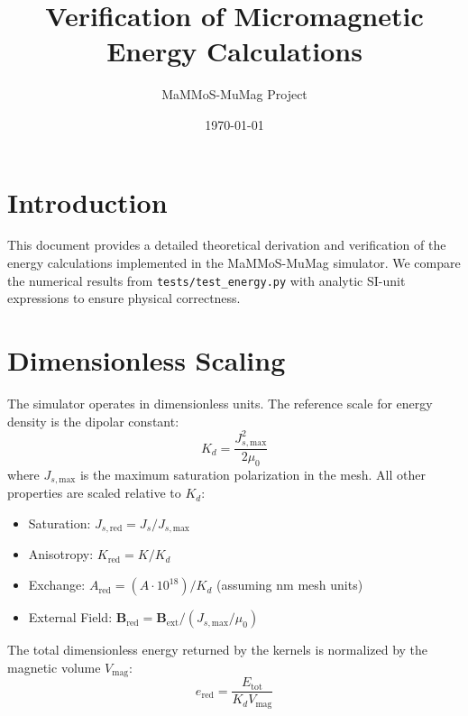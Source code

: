 \documentclass[11pt]{article}
\title{Verification of Micromagnetic Energy Calculations}
\author{MaMMoS-MuMag Project}
\date{\today}
\begin{document}
\maketitle

\section{Introduction}
This document provides a detailed theoretical derivation and verification of the energy calculations implemented in the MaMMoS-MuMag simulator. We compare the numerical results from \texttt{tests/test\_energy.py} with analytic SI-unit expressions to ensure physical correctness.

\section{Dimensionless Scaling}
The simulator operates in dimensionless units. The reference scale for energy density is the dipolar constant:
\begin{equation}
    K_d = \frac{J_{s,\text{max}}^2}{2\mu_0}
\end{equation}
where $J_{s,\text{max}}$ is the maximum saturation polarization in the mesh. All other properties are scaled relative to $K_d$:
\begin{itemize}
    \item Saturation: $J_{s,\text{red}} = J_s / J_{s,\text{max}}$
    \item Anisotropy: $K_{\text{red}} = K / K_d$
    \item Exchange: $A_{\text{red}} = (A \cdot 10^{18}) / K_d$ (assuming nm mesh units)
    \item External Field: $\mathbf{B}_{\text{red}} = \mathbf{B}_{\text{ext}} / (J_{s,\text{max}}/\mu_0)$
\end{itemize}
The total dimensionless energy returned by the kernels is normalized by the magnetic volume $V_{\text{mag}}$:
\begin{equation}
    e_{\text{red}} = \frac{E_{\text{tot}}}{K_d V_{\text{mag}}}
\end{equation}
\end{document}

